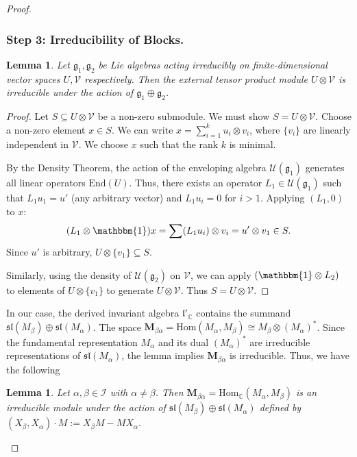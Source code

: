 \documentclass[11pt,letterpaper]{article}
\newcounter{alg}
\theoremstyle{plain}
\theoremstyle{plain}
\theoremstyle{plain}
\theoremstyle{plain}
\theoremstyle{plain}
\theoremstyle{plain}
\newcommand{\C}{\mathbb{C}}
\newcommand{\End}{\mathrm{End}}
\newcommand{\Hom}{\mathrm{Hom}}
\newcommand{\I}{\mathbbm{1}}
\theoremstyle{plain}
\newtheorem{smlemma}[smtheorem]{Lemma}
\theoremstyle{definition}
\theoremstyle{plain}
\begin{document}
\begin{proof}
\subsubsection*{Step 3: Irreducibility of Blocks.}

\begin{smlemma}
    Let $\mathfrak{g}_1, \mathfrak{g}_2$ be Lie algebras acting irreducibly on finite-dimensional vector spaces $U, \mathcal{V}$ respectively. 
    Then the external tensor product module $U \otimes \mathcal{V}$ is irreducible under the action of $\mathfrak{g}_1 \oplus \mathfrak{g}_2$.
\end{smlemma}

\begin{proof}
    Let $S \subseteq U \otimes \mathcal{V}$ be a non-zero submodule. We must show $S = U \otimes \mathcal{V}$.
    Choose a non-zero element $x \in S$. We can write $x = \sum_{i=1}^k u_i \otimes v_i$, where $\{v_i\}$ are linearly independent in $\mathcal{V}$. We choose $x$ such that the rank $k$ is minimal.
    
    By the Density Theorem, the action of the enveloping algebra $\mathcal{U}(\mathfrak{g}_1)$ generates all linear operators $\End(U)$. 
    Thus, there exists an operator $L_1 \in \mathcal{U}(\mathfrak{g}_1)$ such that $L_1 u_1 = u'$ (any arbitrary vector) and $L_1 u_i = 0$ for $i > 1$.
    Applying $(L_1, 0)$ to $x$:
    \[ (L_1 \otimes \I) x = \sum (L_1 u_i) \otimes v_i = u' \otimes v_1 \in S. \]
    Since $u'$ is arbitrary, $U \otimes \{v_1\} \subseteq S$.
    
    Similarly, using the density of $\mathcal{U}(\mathfrak{g}_2)$ on $\mathcal{V}$, we can apply $(\I \otimes L_2)$ to elements of $U \otimes \{v_1\}$ to generate $U \otimes \mathcal{V}$. Thus $S = U \otimes \mathcal{V}$.
\end{proof}

In our case, the derived invariant algebra $\mathfrak{l}'_\C$ contains the summand $\mathfrak{sl}(M_{\beta}) \oplus \mathfrak{sl}(M_{\alpha})$. 
The space $\mathbf{M}_{\beta\alpha} = \Hom(M_{\alpha}, M_{\beta}) \cong M_{\beta} \otimes (M_{\alpha})^*$.
Since the fundamental representation $M_{\alpha}$ and its dual $(M_{\alpha})^*$ are irreducible representations of $\mathfrak{sl}(M_{\alpha})$, 
the lemma implies $\mathbf{M}_{\beta\alpha}$ is irreducible.
Thus, we have the following

\begin{smlemma}\label{lem:irreducibility}
Let $\alpha,\beta\in\mathcal I$ with $\alpha\neq \beta$. Then
$
\mathbf M_{\beta\alpha}=\Hom_\C(M_\alpha,M_\beta)
$
is an irreducible module under the action of
$
\mathfrak{sl}\left(M_\beta\right) \oplus \mathfrak{sl}\left(M_\alpha\right)
$
defined by
$
(X_\beta,X_\alpha)\cdot M := X_\beta M - M X_\alpha .
$
\end{smlemma}


\end{proof}
\end{document}
